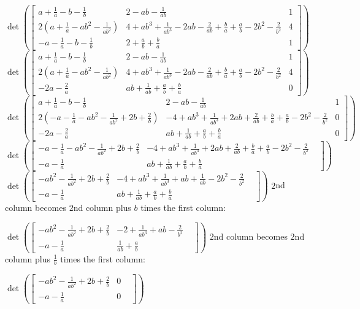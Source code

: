 \begin{enumerate}
 $\det(\begin{bmatrix} a+\frac{1}{a}-b-\frac{1}{b}& 2-ab-\frac{1}{ab} & 1\\ 2(a+\frac{1}{a}-ab^2-\frac{1}{ab^2})& 4+ab^3+\frac{1}{ab^3}-2ab-\frac{2}{ab}+\frac{b}{a}+\frac{a}{b}-2b^2-\frac{2}{b^2}& 4\\ -a-\frac{1}{a}-b-\frac{1}{b}&2+\frac{a}{b}+\frac{b}{a}&1 \end{bmatrix})$
$\det(\begin{bmatrix} a+\frac{1}{a}-b-\frac{1}{b}& 2-ab-\frac{1}{ab} & 1\\ 2(a+\frac{1}{a}-ab^2-\frac{1}{ab^2})& 4+ab^3+\frac{1}{ab^3}-2ab-\frac{2}{ab}+\frac{b}{a}+\frac{a}{b}-2b^2-\frac{2}{b^2}& 4\\ -2a-\frac{2}{a}&ab+\frac{1}{ab}+\frac{a}{b}+\frac{b}{a}&0 \end{bmatrix})$
$\det(\begin{bmatrix} a+\frac{1}{a}-b-\frac{1}{b}& 2-ab-\frac{1}{ab} & 1\\ 2(-a-\frac{1}{a}-ab^2-\frac{1}{ab^2}+2b+\frac{2}{b})& -4+ab^3+\frac{1}{ab^3}+2ab+\frac{2}{ab}+\frac{b}{a}+\frac{a}{b}-2b^2-\frac{2}{b^2}& 0\\ -2a-\frac{2}{a}&ab+\frac{1}{ab}+\frac{a}{b}+\frac{b}{a}&0 \end{bmatrix})$
$\det(\begin{bmatrix} -a-\frac{1}{a}-ab^2-\frac{1}{ab^2}+2b+\frac{2}{b}& -4+ab^3+\frac{1}{ab^3}+2ab+\frac{2}{ab}+\frac{b}{a}+\frac{a}{b}-2b^2-\frac{2}{b^2}&\\ -a-\frac{1}{a}&ab+\frac{1}{ab}+\frac{a}{b}+\frac{b}{a} \end{bmatrix})$
$\det(\begin{bmatrix} -ab^2-\frac{1}{ab^2}+2b+\frac{2}{b}& -4+ab^3+\frac{1}{ab^3}+ab+\frac{1}{ab}-2b^2-\frac{2}{b^2}&\\ -a-\frac{1}{a}&ab+\frac{1}{ab}+\frac{a}{b}+\frac{b}{a} \end{bmatrix})$
$2$nd column becomes $2$nd column plus $b$ times the first column:

 
$\det(\begin{bmatrix} -ab^2-\frac{1}{ab^2}+2b+\frac{2}{b}& -2+\frac{1}{ab^3}+ab-\frac{2}{b^2}&\\ -a-\frac{1}{a}&\frac{1}{ab}+\frac{a}{b} \end{bmatrix})$
$2$nd column becomes $2$nd column plus $\frac{1}{b}$ times the first column:

 $\det(\begin{bmatrix} -ab^2-\frac{1}{ab^2}+2b+\frac{2}{b}& 0&\\ -a-\frac{1}{a}&0 \end{bmatrix})$


\end{enumerate}
